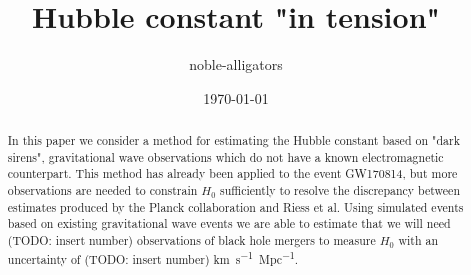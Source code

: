 \documentclass[a4paper, amsfonts, amssymb, amsmath, reprint, showkeys, nofootinbib, twoside]{revtex4-1}
\begin{document}
\title{Hubble constant "in tension"}

\author{noble-alligators}

\date{\today} %

\begin{abstract}
  In this paper we consider a method for estimating the Hubble constant based on "dark sirens", gravitational wave observations which do not have a known electromagnetic counterpart. This method has already been applied to the event GW170814, but more observations are needed to constrain $H_0$ sufficiently to resolve the discrepancy between estimates produced by the Planck collaboration and Riess et al. Using simulated events based on existing gravitational wave events we are able to estimate that we will need (TODO: insert number) observations of black hole mergers  to measure $H_0$ with an uncertainty of (TODO: insert number) \si{km.s^{-1}.Mpc^{-1}}.
\end{abstract}



\maketitle




%


%

%
%



\end{document}
